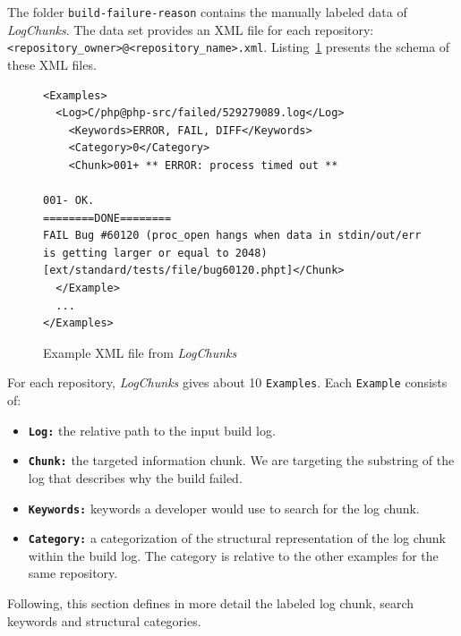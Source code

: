 \documentclass[\myrootdir/main.tex]{subfiles}
\begin{document}
The folder \texttt{build-failure-reason} contains the manually labeled data of \emph{LogChunks}.
The data set provides an XML file for each repository: \texttt{\textless repository\_owner\textgreater @\textless repository\_name\textgreater.xml}.
Listing~\ref{lst:examples} presents the schema of these XML files.

\begin{figure}[]
	\centering
\begin{lstlisting}[breaklines=true]
<Examples>
  <Log>C/php@php-src/failed/529279089.log</Log>
    <Keywords>ERROR, FAIL, DIFF</Keywords>
    <Category>0</Category>
    <Chunk>001+ ** ERROR: process timed out **

001- OK.
========DONE========
FAIL Bug #60120 (proc_open hangs when data in stdin/out/err is getting larger or equal to 2048) [ext/standard/tests/file/bug60120.phpt]</Chunk>
  </Example>
  ...
</Examples>
\end{lstlisting}
	
	\caption{Example XML file from \emph{LogChunks}}
	\label{lst:examples}
\end{figure}

For each repository, \emph{LogChunks} gives about 10 \texttt{Examples}.
Each \texttt{Example} consists of:
\begin{itemize}
	\item \textbf{\texttt{Log:}} the relative path to the input build log.
	\item \textbf{\texttt{Chunk:}} the targeted information chunk. We are targeting the substring of the log that describes why the build failed.
	\item \textbf{\texttt{Keywords:}} keywords a developer would use to search for the log chunk.
	\item \textbf{\texttt{Category:}} a categorization of the structural representation of the log chunk within the build log.
				The category is relative to the other examples for the same repository.
\end{itemize}
Following, this section defines in more detail the labeled log chunk, search keywords and structural categories.
\end{document}
